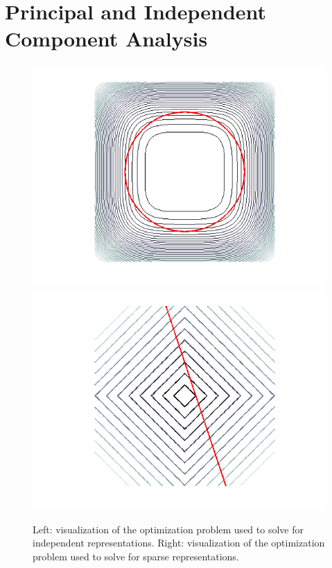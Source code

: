 \section{Principal and Independent Component Analysis} 

\begin{figure} 
\centering
\includegraphics[scale=0.4]{./figures/related_work/ICA.png} 
\includegraphics[scale=0.4]{./figures/related_work/L1.png} 
\caption{Left: visualization of the optimization problem used to solve for independent representations. Right: visualization of the optimization problem used to solve for sparse representations.} 
\label{fig:ICA_lasso} 
\end{figure}  

